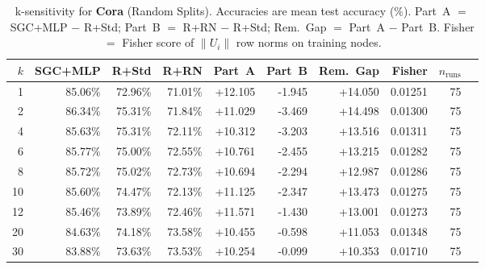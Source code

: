 \begin{table}[t]
\centering\small\setlength{\tabcolsep}{5pt}
\caption{k-sensitivity for \textbf{Cora} (Random Splits). Accuracies are mean test accuracy (\%). Part~A $=$ SGC+MLP $-$ R+Std; Part~B $=$ R+RN $-$ R+Std; Rem.~Gap $=$ Part~A $-$ Part~B. Fisher $=$ Fisher score of $\|U_i\|$ row norms on training nodes.}
\label{tab:exp8_per_dataset_cora_random}
\begin{tabular}{rrrrrrrrrr}
\toprule
$k$ & SGC+MLP & R+Std & R+RN & Part~A & Part~B & Rem.~Gap & Fisher & $n_{\mathrm{runs}}$ \\
\midrule
1 & 85.06\% & 72.96\% & 71.01\% & +12.105 & -1.945 & +14.050 & 0.01251 & 75 \\
2 & 86.34\% & 75.31\% & 71.84\% & +11.029 & -3.469 & +14.498 & 0.01300 & 75 \\
4 & 85.63\% & 75.31\% & 72.11\% & +10.312 & -3.203 & +13.516 & 0.01311 & 75 \\
6 & 85.77\% & 75.00\% & 72.55\% & +10.761 & -2.455 & +13.215 & 0.01282 & 75 \\
8 & 85.72\% & 75.02\% & 72.73\% & +10.694 & -2.294 & +12.987 & 0.01286 & 75 \\
10 & 85.60\% & 74.47\% & 72.13\% & +11.125 & -2.347 & +13.473 & 0.01275 & 75 \\
12 & 85.46\% & 73.89\% & 72.46\% & +11.571 & -1.430 & +13.001 & 0.01273 & 75 \\
20 & 84.63\% & 74.18\% & 73.58\% & +10.455 & -0.598 & +11.053 & 0.01348 & 75 \\
30 & 83.88\% & 73.63\% & 73.53\% & +10.254 & -0.099 & +10.353 & 0.01710 & 75 \\
\bottomrule
\end{tabular}
\end{table}

